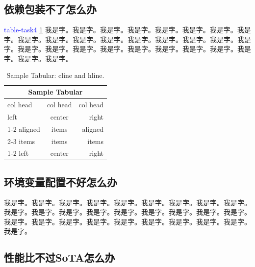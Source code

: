 \documentclass[supercite]{HustGraduPaper}
\theoremstyle{definition}
\begin{document}
\subsection{依赖包装不了怎么办}


\textcolor{blue}{table-task4 \ref{table_eval}}
我是字。我是字。我是字。我是字。我是字。我是字。我是字。我是字。我是字。我是字。我是字。我是字。我是字。我是字。我是字。我是字。我是字。我是字。我是字。我是字。我是字。我是字。我是字。我是字。我是字。我是字。我是字。我是字。

\begin{table}
	\begin{center}
		\setlength{\tabcolsep}{5.0mm}
		\caption{Sample Tabular: cline and hline.}
		\begin{tabular}{|l|c|r|}
			\hline
			\multicolumn{3}{|c|}{Sample Tabular}\\
			\hline
			col head  &  col head  & col head\\
			\hline
			left      &  center    & right\\
			\cline{1-2}
			aligned   & items      & aligned\\
			\cline{2-3}
			items     & items      & items\\
			\cline{1-2}
			left      & center     & right\\
			\hline
		\end{tabular}\label{table_eval}
	\end{center}
\end{table}

\subsection{环境变量配置不好怎么办}


我是字。我是字。我是字。我是字。我是字。我是字。我是字。我是字。我是字。我是字。我是字。我是字。我是字。我是字。我是字。我是字。我是字。我是字。我是字。我是字。我是字。我是字。我是字。我是字。我是字。我是字。我是字。我是字。

\subsection{性能比不过SoTA怎么办}
\end{document}
